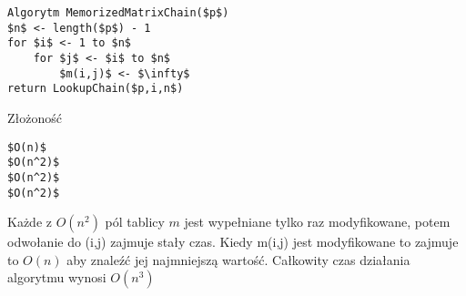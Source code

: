 \begin{lstlisting}
Algorytm MemorizedMatrixChain($p$)
$n$ <- length($p$) - 1
for $i$ <- 1 to $n$
	for $j$ <- $i$ to $n$
		$m(i,j)$ <- $\infty$
return LookupChain($p,i,n$)
\end{lstlisting}

Złożoność 
\begin{lstlisting}
$O(n)$
$O(n^2)$
$O(n^2)$
$O(n^2)$
\end{lstlisting}

Każde z $O(n^2)$ pól tablicy $m$ jest wypełniane tylko raz modyfikowane, potem odwołanie do (i,j) zajmuje stały czas.
Kiedy m(i,j) jest modyfikowane to zajmuje to $O(n)$ aby znaleźć jej najmniejszą wartość.
Całkowity czas działania algorytmu wynosi $O(n^3)$

